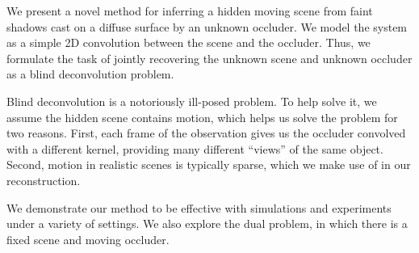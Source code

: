 We present a novel method for inferring a hidden moving scene from faint shadows cast on a diffuse surface by an unknown occluder. We model the system as a simple 2D convolution between the scene and the occluder. Thus, we formulate the task of jointly recovering the unknown scene and unknown occluder as a blind deconvolution problem.

Blind deconvolution is a notoriously ill-posed problem. To help solve it, we assume the hidden scene contains motion, which helps us solve the problem for two reasons. First, each frame of the observation gives us the occluder convolved with a different kernel, providing many different ``views'' of the same object. Second, motion in realistic scenes is typically sparse, which we make use of in our reconstruction.

We demonstrate our method to be effective with simulations and experiments under a variety of settings. We also explore the dual problem, in which there is a fixed scene and moving occluder.

